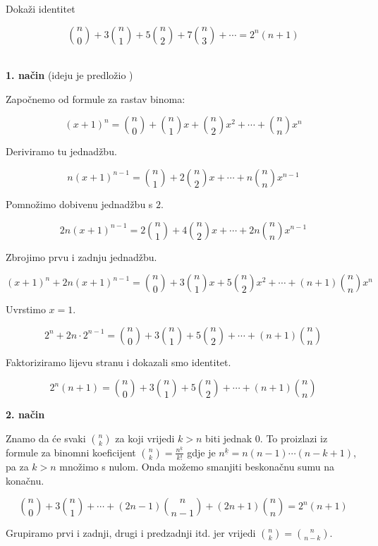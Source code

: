 \documentclass[exam.tex]{subfiles}
\begin{document}
	\begin{task}
		Dokaži identitet
	
		\[ \binom{n}{0} + 3 \binom{n}{1} + 5 \binom{n}{2} + 7 \binom{n}{3} + \cdots = 2^n (n + 1) \] \\[1em]
	\end{task}

	\textbf{1. način} (ideju je predložio \UkiseljeniKrastavac)
	
	Započnemo od formule za rastav binoma:
	
	\[ (x + 1)^n = \binom{n}{0} + \binom{n}{1} x + \binom{n}{2} x^2 + \cdots + \binom{n}{n} x^n \]
	
	Deriviramo tu jednadžbu.
	
	\[ n (x + 1)^{n - 1} = \binom{n}{1} + 2 \binom{n}{2} x + \cdots + n \binom{n}{n} x^{n - 1} \]
	
	Pomnožimo dobivenu jednadžbu s \( 2 \).
	
	\[ 2 n (x + 1)^{n - 1} = 2 \binom{n}{1} + 4 \binom{n}{2} x + \cdots + 2 n \binom{n}{n} x^{n - 1} \]
	
	Zbrojimo prvu i zadnju jednadžbu.
	
	\[ (x + 1)^n + 2 n (x + 1)^{n - 1} = \binom{n}{0} + 3 \binom{n}{1} x + 5 \binom{n}{2} x^2 + \cdots + (n + 1) \binom{n}{n} x^n \]
	
	Uvrstimo \( x = 1 \).
	
	\[ 2^n + 2 n \cdot 2^{n - 1} = \binom{n}{0} + 3 \binom{n}{1} + 5 \binom{n}{2} + \cdots + (n + 1) \binom{n}{n} \]
	
	Faktoriziramo lijevu stranu i dokazali smo identitet.
	
	\[ 2^n (n + 1) = \binom{n}{0} + 3 \binom{n}{1} + 5 \binom{n}{2} + \cdots + (n + 1) \binom{n}{n} \] 
	
	\textbf{2. način}
	
	Znamo da će svaki \( \displaystyle \binom{n}{k} \) za koji vrijedi \( k > n \) biti jednak 0. To proizlazi iz formule za binomni koeficijent \( \displaystyle \binom{n}{k} = \frac{n^{\underline{k}}}{k!} \) gdje je \( n^{\underline{k}} = n (n - 1) \cdots (n - k + 1) \), pa za \( k > n\) množimo s nulom. Onda možemo smanjiti beskonačnu sumu na konačnu.
	
	\[ \binom{n}{0} + 3 \binom{n}{1} + \cdots + (2n - 1) \binom{n}{n - 1} + (2n + 1) \binom{n}{n} = 2^n (n + 1) \]
	
	Grupiramo prvi i zadnji, drugi i predzadnji itd. jer vrijedi \( \binom{n}{k} = \binom{n}{n - k} \). \\
	
\end{document}
